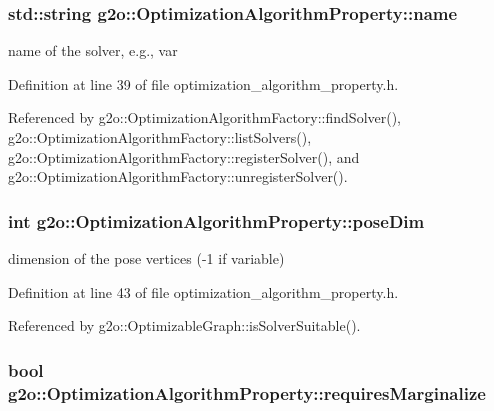 \subsubsection[{\texorpdfstring{name}{name}}]{\setlength{\rightskip}{0pt plus 5cm}std\+::string g2o\+::\+Optimization\+Algorithm\+Property\+::name}\hypertarget{structg2o_1_1OptimizationAlgorithmProperty_aedb3c54122d6a75d49e1677e836bac22}{}\label{structg2o_1_1OptimizationAlgorithmProperty_aedb3c54122d6a75d49e1677e836bac22}


name of the solver, e.\+g., var 



Definition at line 39 of file optimization\+\_\+algorithm\+\_\+property.\+h.



Referenced by g2o\+::\+Optimization\+Algorithm\+Factory\+::find\+Solver(), g2o\+::\+Optimization\+Algorithm\+Factory\+::list\+Solvers(), g2o\+::\+Optimization\+Algorithm\+Factory\+::register\+Solver(), and g2o\+::\+Optimization\+Algorithm\+Factory\+::unregister\+Solver().

\subsubsection[{\texorpdfstring{pose\+Dim}{poseDim}}]{\setlength{\rightskip}{0pt plus 5cm}int g2o\+::\+Optimization\+Algorithm\+Property\+::pose\+Dim}\hypertarget{structg2o_1_1OptimizationAlgorithmProperty_a2c0c87eeaa423e8c944cfa846eb6a553}{}\label{structg2o_1_1OptimizationAlgorithmProperty_a2c0c87eeaa423e8c944cfa846eb6a553}


dimension of the pose vertices (-\/1 if variable) 



Definition at line 43 of file optimization\+\_\+algorithm\+\_\+property.\+h.



Referenced by g2o\+::\+Optimizable\+Graph\+::is\+Solver\+Suitable().

\subsubsection[{\texorpdfstring{requires\+Marginalize}{requiresMarginalize}}]{\setlength{\rightskip}{0pt plus 5cm}bool g2o\+::\+Optimization\+Algorithm\+Property\+::requires\+Marginalize}\hypertarget{structg2o_1_1OptimizationAlgorithmProperty_a179837f3866e8786ce3a7f7a34bdda44}{}\label{structg2o_1_1OptimizationAlgorithmProperty_a179837f3866e8786ce3a7f7a34bdda44}


